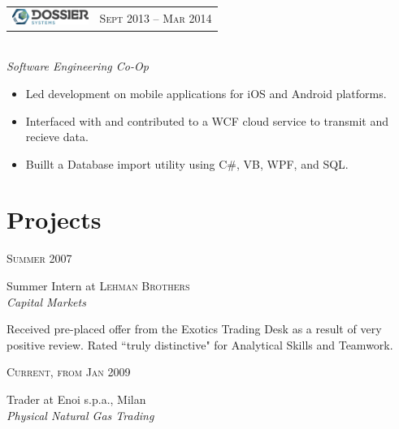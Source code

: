 \documentclass[10pt]{article}
\begin{document}
{\begin{minipage}[t]{0.5\textwidth}

\begin{tabular}{ L{5cm} R{3.5cm} }
\includegraphics[height=0.5cm]{dossier} & 
{\raggedleft\textsc{Sept 2013 -- Mar 2014}} \\
\end{tabular}
{\raggedright\large\\
\textit{Software Engineering Co-Op}\\[5pt]}



\begin{itemize}
  \item[\ding{226}] Led development on mobile applications for iOS and Android platforms.
  \item[\ding{226}] Interfaced with and contributed to a WCF cloud service to transmit and recieve data.
  \item[\ding{226}] Buillt a Database import utility using C\#, VB, WPF, and SQL.
\end{itemize}

\section{Projects} 


{\raggedleft\textsc{Summer 2007}\par}

{\raggedright\large Summer Intern at \textsc{Lehman Brothers}\\
\textit{Capital Markets}\\[5pt]}

\normalsize{Received pre-placed offer from the Exotics Trading Desk as a result of very positive review. Rated ``truly distinctive" for Analytical Skills and Teamwork.}\\


{\raggedleft\textsc{Current, from Jan 2009}\par}

{\raggedright\large Trader at Enoi s.p.a., Milan\\
\textit{Physical Natural Gas Trading}\\[5pt]}


\end{minipage}}
\end{document}
